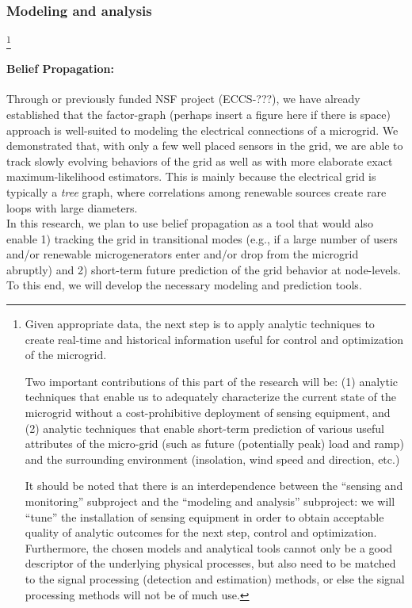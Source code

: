 
\subsubsection{Modeling and analysis}
\label{sec:modeling}

\footnote{Given appropriate data, the next step is to apply analytic techniques
  to create real-time and historical information useful for control and
  optimization of the microgrid.

  Two important contributions of this part of the
  research will be: (1) analytic techniques that enable us to adequately
  characterize the current state of the microgrid without a
  cost-prohibitive deployment of sensing equipment, and (2) analytic
  techniques that enable short-term prediction of various useful attributes
  of the micro-grid (such as future (potentially peak) load and ramp) and
  the surrounding environment (insolation, wind speed and direction, etc.)

  It should be noted that there is an interdependence between the ``sensing
  and monitoring'' subproject and the ``modeling and analysis'' subproject:
  we will ``tune'' the installation of sensing equipment in order to obtain
  acceptable quality of analytic outcomes for the next step, control and
  optimization. Furthermore, the chosen models and analytical tools cannot
  only be a good descriptor of the underlying physical processes, but also
  need to be matched to the signal processing (detection and estimation)
  methods, or else the signal processing methods will not be of much use.}

\paragraph{Belief Propagation:} Through or previously funded NSF project (ECCS-???),
we have already established that the factor-graph ({\sc perhaps
insert a figure here if there is space}) approach is well-suited to
modeling the electrical connections of a microgrid. We demonstrated
that, with only a few well placed sensors in the grid, we are able
to track slowly evolving behaviors of the grid as well as with more
elaborate exact maximum-likelihood estimators. This is mainly
because the electrical grid is typically a {\em tree} graph, where
correlations among renewable sources create rare loops with large
diameters. \\
\indent In this research, we plan to use belief propagation as a
tool that would also enable 1) tracking the grid in transitional
modes (e.g., if a large number of users and/or renewable
microgenerators enter and/or drop from the microgrid abruptly) and
2) short-term future prediction of the grid behavior at node-levels.
To this end, we will develop the necessary modeling and prediction
tools.

